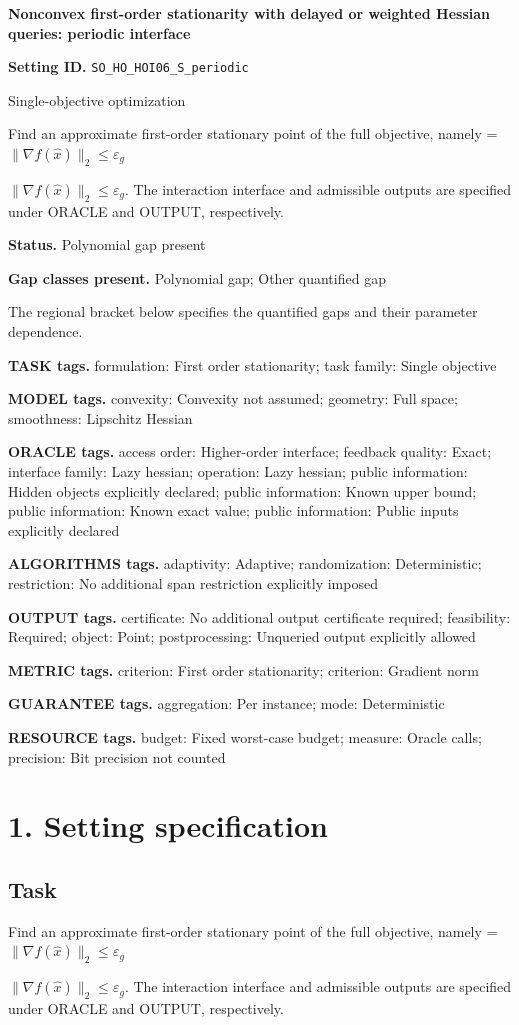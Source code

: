 \documentclass[10pt,a4paper]{article}
\newcommand{\AtlasMath}[1]{\par\begingroup\centering\setbox0=\hbox{$\displaystyle #1$}\ifdim\wd0>1.4\linewidth\typeout{ATLAS WIDE FORMULA: \the\wd0}\fi\ifdim\wd0>\linewidth\resizebox{\linewidth}{!}{\box0}\else\box0\fi\par\endgroup}
\newcommand{\AtlasInlineMath}[1]{\begingroup\setbox0=\hbox{$#1$}\ifdim\wd0>.4\linewidth\endgroup\AtlasMath{#1}\else\endgroup$#1$\fi}
\begin{document}
\raggedright

{\LARGE\bfseries\sffamily\color{AtlasNavy} Nonconvex first-order stationarity with delayed or weighted Hessian queries: periodic interface\par}\vspace{5pt}
\textbf{Setting ID.} \texttt{SO\_\allowbreak{}HO\_\allowbreak{}HOI06\_\allowbreak{}S\_\allowbreak{}periodic}

Single-objective optimization

Find an approximate first-order stationary point of the full objective, namely \AtlasInlineMath{\|\nabla f(\widehat{x})\|_2\le\varepsilon_g}. The interaction interface and admissible outputs are specified under ORACLE and OUTPUT, respectively.

\textbf{Status.} Polynomial gap present

\textbf{Gap classes present.} Polynomial gap; Other quantified gap

The regional bracket below specifies the quantified gaps and their parameter dependence.

\textbf{TASK tags.} formulation: First order stationarity; task family: Single objective

\textbf{MODEL tags.} convexity: Convexity not assumed; geometry: Full space; smoothness: Lipschitz Hessian

\textbf{ORACLE tags.} access order: Higher-order interface; feedback quality: Exact; interface family: Lazy hessian; operation: Lazy hessian; public information: Hidden objects explicitly declared; public information: Known upper bound; public information: Known exact value; public information: Public inputs explicitly declared

\textbf{ALGORITHMS tags.} adaptivity: Adaptive; randomization: Deterministic; restriction: No additional span restriction explicitly imposed

\textbf{OUTPUT tags.} certificate: No additional output certificate required; feasibility: Required; object: Point; postprocessing: Unqueried output explicitly allowed

\textbf{METRIC tags.} criterion: First order stationarity; criterion: Gradient norm

\textbf{GUARANTEE tags.} aggregation: Per instance; mode: Deterministic

\textbf{RESOURCE tags.} budget: Fixed worst-case budget; measure: Oracle calls; precision: Bit precision not counted

\section{1. Setting specification}
\subsection{Task}
Find an approximate first-order stationary point of the full objective, namely \AtlasInlineMath{\|\nabla f(\widehat{x})\|_2\le\varepsilon_g}. The interaction interface and admissible outputs are specified under ORACLE and OUTPUT, respectively.
\end{document}
